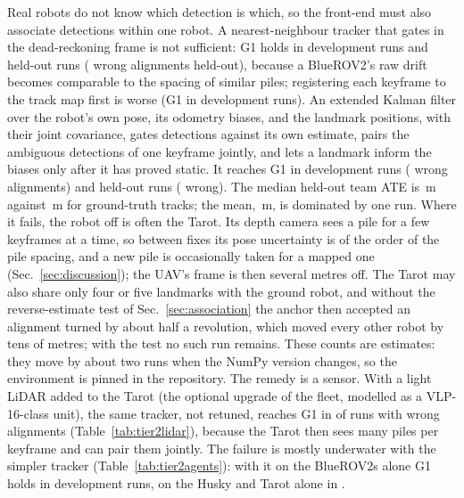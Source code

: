 Real robots do not know which detection is which, so the front-end must also associate
detections within one robot. A nearest-neighbour tracker that gates in the dead-reckoning frame
is not sufficient: G1 holds in \tierTwoNNGOne{} development runs and \heldTwoNNGOne{} held-out
runs (\heldTwoNNWrong{} wrong alignments held-out), because a BlueROV2's raw drift becomes
comparable to the spacing of similar piles; registering each keyframe to the track map first is
worse (G1 in \tierTwoRegGOne{} development runs). An extended Kalman filter over the robot's own
pose, its odometry biases, and the landmark positions, with their joint covariance, gates
detections against its own estimate, pairs the ambiguous detections of one keyframe jointly, and
lets a landmark inform the biases only after it has proved static. It reaches G1 in
\tierTwoEKFGOne{} development runs (\tierTwoEKFWrong{} wrong alignments) and \heldTwoEKFGOne{}
held-out runs (\heldTwoEKFWrong{} wrong). The median held-out team ATE is \heldTwoEKFMedian\,m
against \heldTwoMedian\,m for ground-truth tracks; the mean, \heldTwoEKFAvatar\,m, is dominated by one
run. Where it fails, the robot off is often the Tarot. Its depth camera sees a pile for
a few keyframes at a time, so between fixes its pose uncertainty is of the order of the pile
spacing, and a new pile is occasionally taken for a mapped one (Sec.~\ref{sec:discussion}); the UAV's
frame is then several metres off. The Tarot may also share only four or five landmarks with the
ground robot, and without the reverse-estimate test of Sec.~\ref{sec:association} the anchor then
accepted an alignment turned by about half a revolution, which moved every other robot by tens of
metres; with the test no such run remains. These counts are estimates: they move by about two runs
when the NumPy version changes, so the environment is pinned in the repository. The remedy is a sensor. With a light LiDAR added to the Tarot
(the optional upgrade of the fleet, modelled as a VLP-16-class unit), the same tracker, not
retuned, reaches G1 in \lidarTwoEKFGOne{} of \lidarTwoEKFRuns{} runs with \lidarTwoEKFWrong{}
wrong alignments (Table~\ref{tab:tier2lidar}), because the Tarot then sees many piles per
keyframe and can pair them jointly. The failure is mostly underwater with the simpler tracker
(Table~\ref{tab:tier2agents}): with it on the BlueROV2s alone G1 holds in \tierTwoNNUuvGOne{}
development runs, on the Husky and Tarot alone in \tierTwoNNLandGOne{}.

